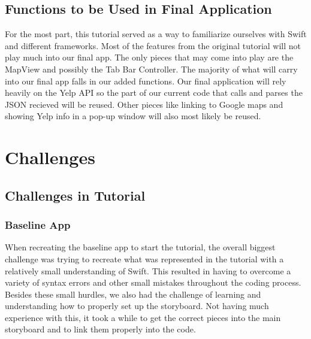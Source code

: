 \documentclass[conference]{IEEEtran}
\begin{document}
\subsection{Functions to be Used in Final Application}
For the most part, this tutorial served as a way to familiarize ourselves with 
Swift and different frameworks. Most of the features from the original tutorial
will not play much into our final app. The only pieces that may come into play
are the MapView and possibly the Tab Bar Controller. The majority of what will
carry into our final app falls in our added functions. Our final application will
rely heavily on the Yelp API so the part of our current code that calls and parses
the JSON recieved will be reused. Other pieces like linking to Google maps and 
showing Yelp info in a pop-up window will also most likely be reused.

\section{Challenges}

\subsection{Challenges in Tutorial}

\subsubsection{Baseline App}
When recreating the baseline app to start the tutorial, the overall biggest challenge
was trying to recreate what was represented in the tutorial with a relatively small
understanding of Swift. This resulted in having to overcome a variety of syntax errors
and other small mistakes throughout the coding process. Besides these small hurdles,
we also had the challenge of learning and understanding how to properly set up the 
storyboard. Not having much experience with this, it took a while to get the correct 
pieces into the main storyboard and to link them properly into the code.
\end{document}
